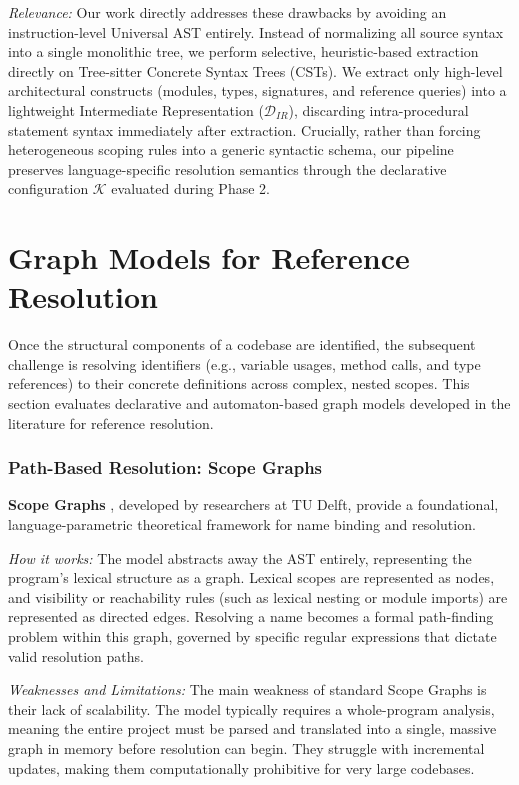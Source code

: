 \textit{Relevance:} Our work directly addresses these drawbacks by avoiding an
instruction-level Universal AST entirely. Instead of normalizing all source
syntax into a single monolithic tree, we perform selective, heuristic-based
extraction directly on Tree-sitter Concrete Syntax Trees (CSTs). We extract
only high-level architectural constructs (modules, types, signatures, and
reference queries) into a lightweight Intermediate Representation
($\mathcal{D}_{IR}$), discarding intra-procedural statement syntax immediately
after extraction. Crucially, rather than forcing heterogeneous scoping rules
into a generic syntactic schema, our pipeline preserves language-specific
resolution semantics through the declarative configuration $\mathcal{K}$
evaluated during Phase 2.

\section{Graph Models for Reference Resolution}
\label{sec:graph_models_reference_resolution}

Once the structural components of a codebase are identified, the
subsequent challenge is resolving identifiers (e.g., variable usages,
method calls, and type references) to their concrete definitions across complex,
nested scopes. This section evaluates declarative and automaton-based graph
models developed in the literature for reference resolution.

\subsubsection{Path-Based Resolution: Scope Graphs}
\label{sec:scope_graphs}

\textbf{Scope Graphs} \cite{zwaan_scope_2023}, developed by
researchers at TU Delft, provide a foundational, language-parametric
theoretical framework for name binding and resolution.

\textit{How it works:} The model abstracts away the AST entirely,
representing the program's lexical structure as a graph. Lexical
scopes are represented as nodes, and visibility or reachability rules
(such as lexical nesting or module imports) are represented as
directed edges. Resolving a name becomes a formal path-finding
problem within this graph, governed by specific regular expressions
that dictate valid resolution paths.

\textit{Weaknesses and Limitations:} The main weakness of standard
Scope Graphs is their lack of scalability. The model typically
requires a whole-program analysis, meaning the entire project must be
parsed and translated into a single, massive graph in memory before
resolution can begin. They struggle with incremental updates, making
them computationally prohibitive for very large codebases.

